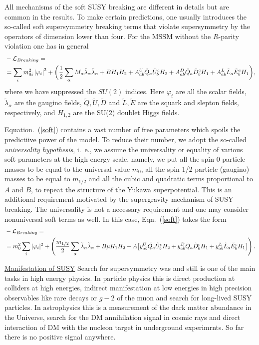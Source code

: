 \documentclass{cernyrep}
\begin{document}
All mechanisms of the soft SUSY breaking are different in
details but are common in the results. To make certain predictions, one usually introduces the
so-called soft supersymmetry breaking terms that violate supersymmetry by the operators of dimension lower than four. For the MSSM without the $R$-parity violation one has
in general
\begin{align}
&- {\cal L}_{Breaking} = \label{soft} \\
&=  \sum_{i}^{} m^2_{0i} \left|\varphi_i\right|^2 +
\biggl( \frac 12 \sum_{\alpha}^{}
M_\alpha \tilde\lambda_\alpha \tilde\lambda_\alpha +
B H_1 H_2 + A^U_{ab} \tilde Q_a \tilde U^c_b H_2 +
A^D_{ab} \tilde Q_a \tilde D^c_b H_1 +
A^L_{ab} \tilde L_a \tilde E^c_b H_1 \biggr), \notag
\end{align}
where we have suppressed the $SU(2)$ indices. Here $\varphi_i$
are all the scalar fields, $\tilde \lambda_\alpha $ are the
gaugino fields, $\tilde Q, \tilde U, \tilde D$ and
$\tilde L, \tilde E$ are the squark and slepton fields,
respectively, and $H_{1,2}$ are the SU(2) doublet Higgs fields.

Equation.~(\ref{soft}) contains a vast number of free parameters
which spoils the predictiive power of the model. To reduce
their number, we adopt the so-called {\em universality
hypothesis}, i.~e., we assume the universality or equality of
various soft parameters at the high energy scale, namely, we
put all the spin-0 particle masses to be equal to the universal
value $m_0$, all the spin-1/2 particle (gaugino) masses to be
equal to $m_{1/2}$ and all the cubic and quadratic terms
proportional to $A$ and $B$, to repeat the structure of the
Yukawa superpotential. This is an additional
requirement motivated by the supergravity mechanism of SUSY
breaking. The universality is not a necessary requirement and
one may consider nonuniversal soft terms as well. 
In this case, Eqn.~(\ref{soft}) takes the form
\begin{align}
&-{\cal L}_{Breaking}= \\
&=m_0^2\sum_{i}^{}|\varphi_i|^2+\left( \frac{ m_{1/2}}{2}
\sum_{\alpha}^{} \tilde \lambda_\alpha\tilde \lambda_\alpha+  B\mu H_1H_2
+A\bigl[y^U_{ab}\tilde Q_a\tilde U^c_bH_2+y^D_{ab}\tilde Q_a
\tilde D^c_bH_1+ y^L_{ab}\tilde L_a\tilde E^c_bH_1\bigr]
\right).\notag
\label{soft2}
\end{align}


\underline{Manifestation of SUSY}  Search for supersymmetry was and still is one of the main 
tasks in high energy physics. In particle physics this is direct production at colliders at high energies, indirect manifestation at low energies in high precision observables like rare decays or $g-2$ of the muon  and search for long-lived SUSY particles.   In astrophysics this is a measurement of the dark matter abundance in the Universe, search for the DM annihilation signal in cosmic rays and direct interaction of DM with the nucleon target in underground experimrnts. So far there is no positive signal anywhere.
\end{document}
